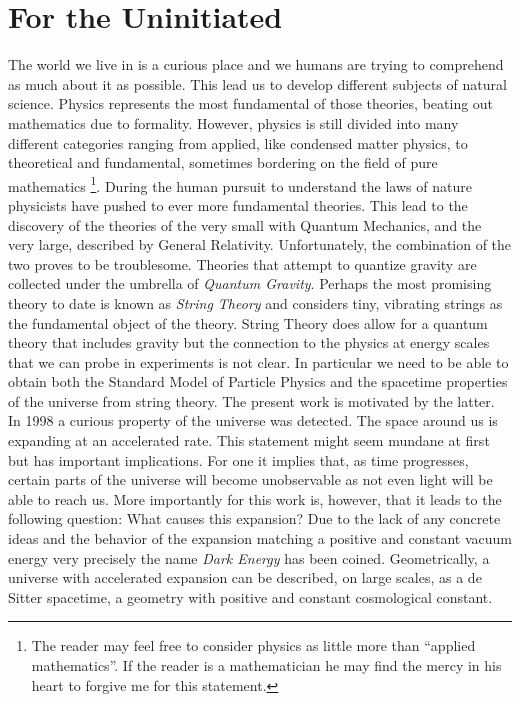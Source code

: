 \documentclass[a4paper,12pt,twoside,openright]{report}
\begin{document}
\newpage

\tableofcontents

\newpage
\newpage\thispagestyle{empty}\vspace*{\fill}
\null 
\vspace*{\fill}\newpage
{}
\chapter{For the Uninitiated}
The world we live in is a curious place and we humans are trying to comprehend as much about it as possible. This lead us to develop different subjects of natural science. Physics represents the most fundamental of those theories, beating out mathematics due to formality. However, physics is still divided into many different categories ranging from applied, like condensed matter physics, to theoretical and fundamental, sometimes bordering on the field of pure mathematics \footnote{The reader may feel free to consider physics as little more than ``applied mathematics''. If the reader is a mathematician he may find the mercy in his heart to forgive me for this statement.}. During the human pursuit to understand the laws of nature physicists have pushed to ever more fundamental theories. This lead to the discovery of the theories of the very small with Quantum Mechanics, and the very large, described by General Relativity. Unfortunately, the combination of the two proves to be troublesome. Theories that attempt to quantize gravity are collected under the umbrella of \emph{Quantum Gravity}. Perhaps the most promising theory to date is known as \emph{String Theory} and considers tiny, vibrating strings as the fundamental object of the theory. String Theory does allow for a quantum theory that includes gravity but the connection to the physics at energy scales that we can probe in experiments is not clear. In particular we need to be able to obtain both the Standard Model of Particle Physics and the spacetime properties of the universe from string theory. The present work is motivated by the latter.\\
In 1998 a curious property of the universe was detected. The space around us is expanding at an accelerated rate. This statement might seem mundane at first but has important implications. For one it implies that, as time  progresses, certain parts of the universe will become unobservable as not even light will be able to reach us. More importantly for this work is, however, that it leads to the following question: What causes this expansion? Due to the lack of any concrete ideas and the behavior of the expansion matching a positive and constant vacuum energy very precisely the name \emph{Dark Energy} has been coined. Geometrically, a universe with accelerated expansion can be described, on large scales, as a de Sitter spacetime, a geometry with positive and constant cosmological constant.\\
\end{document}
